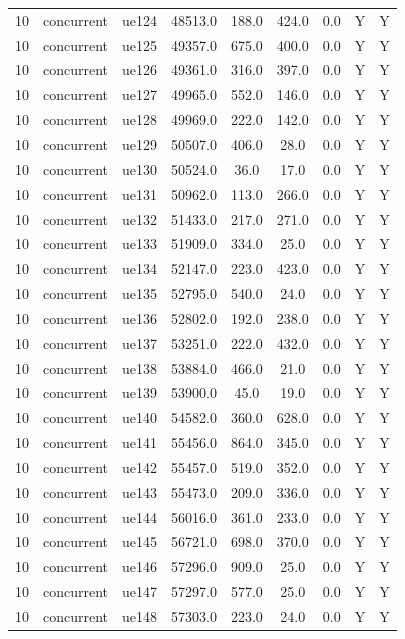\begin{table}[ht]
\begin{tabular}{|c|c|c|c|c|c|c|c|c|}
10 & concurrent & ue124 & 48513.0 & 188.0 & 424.0 & 0.0 & Y & Y \\
10 & concurrent & ue125 & 49357.0 & 675.0 & 400.0 & 0.0 & Y & Y \\
10 & concurrent & ue126 & 49361.0 & 316.0 & 397.0 & 0.0 & Y & Y \\
10 & concurrent & ue127 & 49965.0 & 552.0 & 146.0 & 0.0 & Y & Y \\
10 & concurrent & ue128 & 49969.0 & 222.0 & 142.0 & 0.0 & Y & Y \\
10 & concurrent & ue129 & 50507.0 & 406.0 & 28.0 & 0.0 & Y & Y \\
10 & concurrent & ue130 & 50524.0 & 36.0 & 17.0 & 0.0 & Y & Y \\
10 & concurrent & ue131 & 50962.0 & 113.0 & 266.0 & 0.0 & Y & Y \\
10 & concurrent & ue132 & 51433.0 & 217.0 & 271.0 & 0.0 & Y & Y \\
10 & concurrent & ue133 & 51909.0 & 334.0 & 25.0 & 0.0 & Y & Y \\
10 & concurrent & ue134 & 52147.0 & 223.0 & 423.0 & 0.0 & Y & Y \\
10 & concurrent & ue135 & 52795.0 & 540.0 & 24.0 & 0.0 & Y & Y \\
10 & concurrent & ue136 & 52802.0 & 192.0 & 238.0 & 0.0 & Y & Y \\
10 & concurrent & ue137 & 53251.0 & 222.0 & 432.0 & 0.0 & Y & Y \\
10 & concurrent & ue138 & 53884.0 & 466.0 & 21.0 & 0.0 & Y & Y \\
10 & concurrent & ue139 & 53900.0 & 45.0 & 19.0 & 0.0 & Y & Y \\
10 & concurrent & ue140 & 54582.0 & 360.0 & 628.0 & 0.0 & Y & Y \\
10 & concurrent & ue141 & 55456.0 & 864.0 & 345.0 & 0.0 & Y & Y \\
10 & concurrent & ue142 & 55457.0 & 519.0 & 352.0 & 0.0 & Y & Y \\
10 & concurrent & ue143 & 55473.0 & 209.0 & 336.0 & 0.0 & Y & Y \\
10 & concurrent & ue144 & 56016.0 & 361.0 & 233.0 & 0.0 & Y & Y \\
10 & concurrent & ue145 & 56721.0 & 698.0 & 370.0 & 0.0 & Y & Y \\
10 & concurrent & ue146 & 57296.0 & 909.0 & 25.0 & 0.0 & Y & Y \\
10 & concurrent & ue147 & 57297.0 & 577.0 & 25.0 & 0.0 & Y & Y \\
10 & concurrent & ue148 & 57303.0 & 223.0 & 24.0 & 0.0 & Y & Y \\

\end{tabular}
\end{table}
